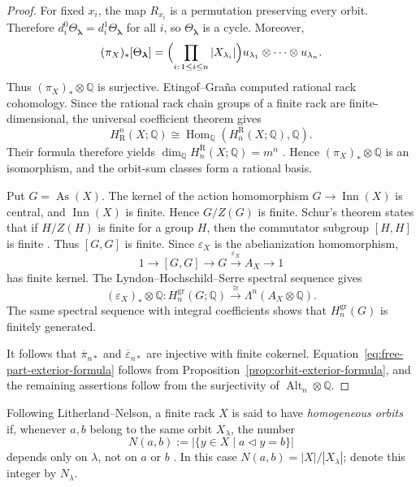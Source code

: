 \documentclass[11pt]{article}
\DeclareMathOperator{\As}{As}
\DeclareMathOperator{\Inn}{Inn}
\newcommand{\QQ}{\mathbb Q}
\newcommand{\gr}{\mathrm{gr}}
\newcommand{\R}{\mathrm R}
\begin{document}
\begin{proof}
For fixed $x_i$, the map $R_{x_i}$ is a permutation preserving every orbit.
Therefore
$d_i^0\Theta_{\boldsymbol\lambda}=d_i^1\Theta_{\boldsymbol\lambda}$ for all
$i$, so $\Theta_{\boldsymbol\lambda}$ is a cycle. Moreover,
\[
(\pi_X)_*[\Theta_{\boldsymbol\lambda}]
 =\Bigl(\prod_{i:\,1\le i\le n}|X_{\lambda_i}|\Bigr)
 u_{\lambda_1}\otimes\cdots\otimes u_{\lambda_n}.
\]
Thus $(\pi_X)_*\otimes\QQ$ is surjective. Etingof--Gra\~na computed rational rack cohomology. Since the rational rack chain groups of a finite rack are
finite-dimensional, the universal coefficient theorem gives
\[
 H^n_\R(X;\QQ)
 \cong\operatorname{Hom}_{\QQ}(H_n^\R(X;\QQ),\QQ).
\]
Their formula therefore yields
$\dim_\QQ H_n^\R(X;\QQ)=m^n$
\cite[Theorem~4.2 and Corollary~4.3]{EtingofGrana}. Hence
$(\pi_X)_*\otimes\QQ$ is an isomorphism, and the orbit-sum classes form a
rational basis.

Put $G=\As(X)$. The kernel of the action homomorphism
$G\to\Inn(X)$ is central, and $\Inn(X)$ is finite. Hence $G/Z(G)$ is finite.
Schur's theorem states that if $H/Z(H)$ is finite for a group $H$, then the
commutator subgroup $[H,H]$ is finite
\cite[Theorem~10.1.4]{RobinsonGroupTheory}. Thus $[G,G]$ is finite. Since
$\varepsilon_X$ is the abelianization homomorphism,
\[
 1\longrightarrow [G,G]\longrightarrow G
 \xrightarrow{\varepsilon_X}A_X\longrightarrow1
\]
has finite kernel. The Lyndon--Hochschild--Serre spectral sequence gives
\cite[Chapter~VII, \S6]{Brown}
\[
 (\varepsilon_X)_*\otimes\QQ\colon
 H_n^{\gr}(G;\QQ)\xrightarrow{\cong}
 \Lambda^n(A_X\otimes\QQ).
\]
The same spectral sequence with integral coefficients shows that
$H_n^{\gr}(G)$ is finitely generated.

It follows that $\overline\pi_{n*}$ and $\overline\varepsilon_{n*}$ are
injective with finite cokernel. Equation~\eqref{eq:free-part-exterior-formula}
follows from Proposition~\ref{prop:orbit-exterior-formula}, and the remaining
assertions follow from the surjectivity of
$\operatorname{Alt}_n\otimes\QQ$.
\end{proof}

Following Litherland--Nelson, a finite rack $X$ is said to have
\emph{homogeneous orbits} if, whenever $a,b$ belong to the same orbit
$X_\lambda$, the number
\[
 N(a,b):=|\{y\in X\mid a\lhd y=b\}|
\]
depends only on $\lambda$, not on $a$ or $b$ \cite[\S1]{LitherlandNelson}.
In this case $N(a,b)=|X|/|X_\lambda|$; denote this integer by $N_\lambda$.
\end{document}

